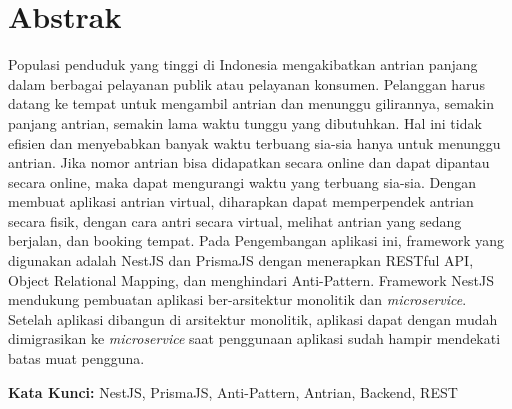\chapter*{Abstrak}
\noindent
\justifying
Populasi penduduk yang tinggi di Indonesia mengakibatkan antrian panjang dalam berbagai pelayanan publik atau pelayanan konsumen. Pelanggan harus datang ke tempat untuk mengambil antrian dan menunggu gilirannya, semakin panjang antrian, semakin lama waktu tunggu yang dibutuhkan. Hal ini tidak efisien dan menyebabkan banyak waktu terbuang sia-sia hanya untuk menunggu antrian. Jika nomor antrian bisa didapatkan secara online dan dapat dipantau secara online, maka dapat mengurangi waktu yang terbuang sia-sia. Dengan membuat aplikasi antrian virtual, diharapkan dapat memperpendek antrian secara fisik, dengan cara antri secara virtual, melihat antrian yang sedang berjalan, dan booking tempat. Pada Pengembangan aplikasi ini, framework yang digunakan adalah NestJS dan PrismaJS dengan menerapkan RESTful API, Object Relational Mapping, dan menghindari Anti-Pattern. Framework NestJS mendukung pembuatan aplikasi ber-arsitektur monolitik dan \textit{microservice}. Setelah aplikasi dibangun di arsitektur monolitik, aplikasi dapat dengan mudah dimigrasikan ke \textit{microservice} saat penggunaan aplikasi sudah hampir mendekati batas muat pengguna.
\vspace{0.5 cm}
\begin{flushleft}
{\textbf{Kata Kunci:} NestJS, PrismaJS, Anti-Pattern, Antrian, Backend, REST}
\end{flushleft}